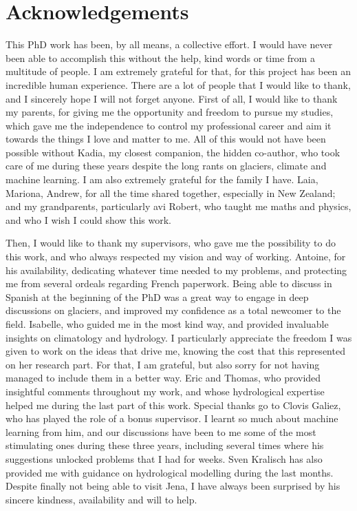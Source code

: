 \section*{Acknowledgements}

This PhD work has been, by all means, a collective effort. I would have never been able to accomplish this without the help, kind words or time from a multitude of people. I am extremely grateful for that, for this project has been an incredible human experience. There are a lot of people that I would like to thank, and I sincerely hope I will not forget anyone. First of all, I would like to thank my parents, for giving me the opportunity and freedom to pursue my studies, which gave me the independence to control my professional career and aim it towards the things I love and matter to me. All of this would not have been possible without Kadia, my closest companion, the hidden co-author, who took care of me during these years despite the long rants on glaciers, climate and machine learning. I am also extremely grateful for the family I have. Laia, Mariona, Andrew, for all the time shared together, especially in New Zealand; and my grandparents, particularly avi Robert, who taught me maths and physics, and who I wish I could show this work. 

Then, I would like to thank my supervisors, who gave me the possibility to do this work, and who always respected my vision and way of working. Antoine, for his availability, dedicating whatever time needed to my problems, and protecting me from several ordeals regarding French paperwork. Being able to discuss in Spanish at the beginning of the PhD was a great way to engage in deep discussions on glaciers, and improved my confidence as a total newcomer to the field. Isabelle, who guided me in the most kind way, and provided invaluable insights on climatology and hydrology. I particularly appreciate the freedom I was given to work on the ideas that drive me, knowing the cost that this represented on her research part. For that, I am grateful, but also sorry for not having managed to include them in a better way. Eric and Thomas, who provided insightful comments throughout my work, and whose hydrological expertise helped me during the last part of this work. Special thanks go to Clovis Galiez, who has played the role of a bonus supervisor. I learnt so much about machine learning from him, and our discussions have been to me some of the most stimulating ones during these three years, including several times where his suggestions unlocked problems that I had for weeks. Sven Kralisch has also provided me with guidance on hydrological modelling during the last months. Despite finally not being able to visit Jena, I have always been surprised by his sincere kindness, availability and will to help. 

